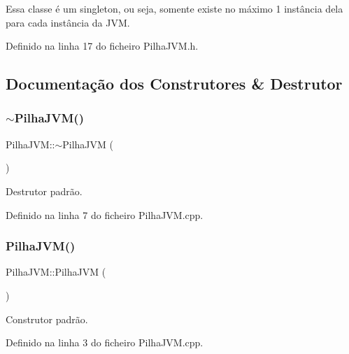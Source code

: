 Essa classe é um singleton, ou seja, somente existe no máximo 1 instância dela para cada instância da J\+VM. 

Definido na linha 17 do ficheiro Pilha\+J\+V\+M.\+h.



\subsection{Documentação dos Construtores \& Destrutor}
\mbox{\label{classPilhaJVM_a7995ffc4e2ca9b149b83293cbbe0ea1b}} 
\subsubsection{\texorpdfstring{$\sim$\+Pilha\+J\+V\+M()}{~PilhaJVM()}}
{\footnotesize\ttfamily Pilha\+J\+V\+M\+::$\sim$\+Pilha\+J\+VM (\begin{DoxyParamCaption}{ }\end{DoxyParamCaption})}



Destrutor padrão. 



Definido na linha 7 do ficheiro Pilha\+J\+V\+M.\+cpp.

\mbox{\label{classPilhaJVM_a7f0451ca9cf124f5098d43928566fadf}} 
\subsubsection{\texorpdfstring{Pilha\+J\+V\+M()}{PilhaJVM()}\hspace{0.1cm}{\footnotesize\ttfamily [1/2]}}
{\footnotesize\ttfamily Pilha\+J\+V\+M\+::\+Pilha\+J\+VM (\begin{DoxyParamCaption}{ }\end{DoxyParamCaption})\hspace{0.3cm}{\ttfamily [private]}}



Construtor padrão. 



Definido na linha 3 do ficheiro Pilha\+J\+V\+M.\+cpp.

\mbox{\label{classPilhaJVM_a051085f51d79d3333356c5d36bef4687}} 
